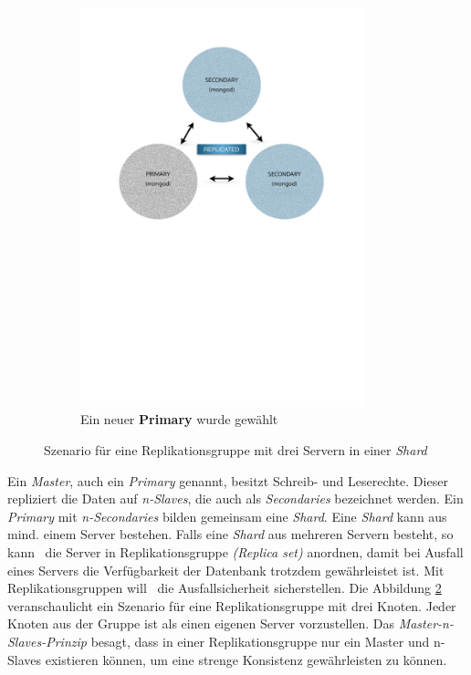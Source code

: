 \begin{figure}[H]
\begin{subfigure}[t]{0.49\textwidth}
        \includegraphics[trim = 28mm 139mm 28mm 29mm, clip, width=0.9\textwidth]{resources/replicaSet/newReplicaSet}
      \caption[Ein neuer \textbf{Primary} wurde gewählt]{Ein neuer \textbf{Primary} wurde gewählt}
      \label{img:newReplicaSet}
   \end{subfigure}
   \caption{Szenario für eine Replikationsgruppe mit drei Servern in einer \textit{Shard}}
   \label{img:replicaSetSzenario}
\end{figure}
Ein \textit{Master}, auch ein \textit{Primary} genannt, besitzt Schreib- und Leserechte. Dieser repliziert die Daten auf \textit{n-Slaves}, die auch als \textit{Secondaries} bezeichnet werden. Ein \textit{Primary} mit \textit{n-Secondaries} bilden gemeinsam eine \textit{Shard}. Eine \textit{Shard} kann aus mind. einem Server bestehen. Falls eine \textit{Shard} aus mehreren Servern besteht, so kann \mongo\ die Server in Replikationsgruppe \textit{(Replica set)} anordnen, damit bei Ausfall eines Servers die Verfügbarkeit der Datenbank trotzdem gewährleistet ist. Mit Replikationsgruppen will \mongo\ die Ausfallsicherheit sicherstellen. Die Abbildung \ref{img:replicaSetSzenario} veranschaulicht ein Szenario für eine Replikationsgruppe mit drei Knoten. Jeder Knoten aus der Gruppe ist als einen eigenen Server vorzustellen. Das \textit{Master-n-Slaves-Prinzip} besagt, dass in einer Replikationsgruppe nur ein Master und n-Slaves existieren können, um eine strenge Konsistenz gewährleisten zu können. 
